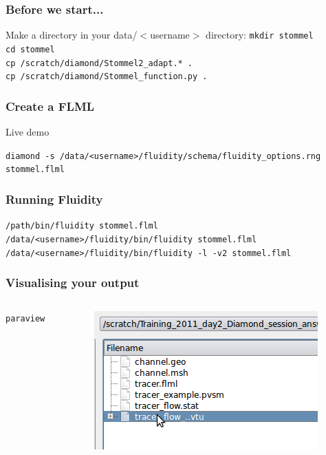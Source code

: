 \documentclass[12pt]{beamer}
\begin{document}
\begin{frame}
    \frametitle{Before we start...}

Make a directory in your data/$<$username$>$ directory: \texttt{mkdir stommel}
\\
\texttt{cd stommel}
\\
\texttt{cp /scratch/diamond/Stommel2\_adapt.* .}
\\
\texttt{cp /scratch/diamond/Stommel\_function.py .}

\end{frame}


\begin{frame}
    \frametitle{Create a FLML}
Live demo

\texttt{diamond -s /data/<username>/fluidity/schema/fluidity\_options.rng stommel.flml}
\end{frame}

\begin{frame}
    \frametitle{Running Fluidity}
\scriptsize{\texttt{/path/bin/fluidity stommel.flml}}
\\
\scriptsize{\texttt{/data/<username>/fluidity/bin/fluidity stommel.flml}}
\\
\scriptsize{\texttt{/data/<username>/fluidity/bin/fluidity -l -v2 stommel.flml}}
\end{frame}


\begin{frame}
	\frametitle{Visualising your output}
\begin{columns}
\begin{column}{0.6\textwidth}

\texttt{paraview}
\end{column}
\begin{column}{0.4\textwidth}
\begin{center}
\includegraphics[width=\textwidth]{images/State_Open.png}
\end{center}
\end{column}
\end{columns}


\end{frame}
\end{document}

